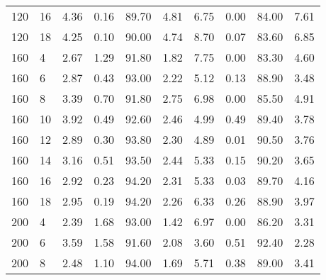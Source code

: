 \begin{table*}[h]
\begin{center}
\begin{tabular} {l l | r r r r | r r r r }
120  &             16  &  4.36   &            0.16             &               89.70  &  4.81   &  6.75   &            0.00             &               84.00  &  7.61   \\
120  &             18  &  4.25   &            0.10             &               90.00  &  4.74   &  8.70   &            0.07             &               83.60  &  6.85   \\
160  &             4   &  2.67   &            1.29             &               91.80  &  1.82   &  7.75   &            0.00             &               83.30  &  4.60   \\
160  &             6   &  2.87   &            0.43             &               93.00  &  2.22   &  5.12   &            0.13             &               88.90  &  3.48   \\
160  &             8   &  3.39   &            0.70             &               91.80  &  2.75   &  6.98   &            0.00             &               85.50  &  4.91   \\
160  &             10  &  3.92   &            0.49             &               92.60  &  2.46   &  4.99   &            0.49             &               89.40  &  3.78   \\
160  &             12  &  2.89   &            0.30             &               93.80  &  2.30   &  4.89   &            0.01             &               90.50  &  3.76   \\
160  &             14  &  3.16   &            0.51             &               93.50  &  2.44   &  5.33   &            0.15             &               90.20  &  3.65   \\
160  &             16  &  2.92   &            0.23             &               94.20  &  2.31   &  5.33   &            0.03             &               89.70  &  4.16   \\
160  &             18  &  2.95   &            0.19             &               94.20  &  2.26   &  6.33   &            0.26             &               88.90  &  3.97   \\
200  &             4   &  2.39   &            1.68             &               93.00  &  1.42   &  6.97   &            0.00             &               86.20  &  3.31   \\
200  &             6   &  3.59   &            1.58             &               91.60  &  2.08   &  3.60   &            0.51             &               92.40  &  2.28   \\
200  &             8   &  2.48   &            1.10             &               94.00  &  1.69   &  5.71   &            0.38             &               89.00  &  3.41   \\

\end{tabular}
\end{center}
\end{table*}
